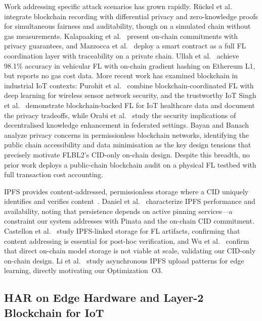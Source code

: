 \documentclass{llncs}
\begin{document}
Work addressing specific attack scenarios has grown rapidly. Rückel et
al.~\cite{ruckel2022fairness} integrate blockchain recording with
differential privacy and zero-knowledge proofs for simultaneous fairness and
auditability, though on a simulated chain without gas measurements.
Kalapaaking et al.~\cite{kalapaaking2024auditable} present on-chain
commitments with privacy guarantees, and Mazzocca et
al.~\cite{mazzocca2025fedcoordination} deploy a smart contract as a full
FL coordination layer with traceability on a private chain. Ullah et
al.~\cite{ullah2025spbfl} achieve 98.1\% accuracy in vehicular FL with
on-chain gradient hashing on Ethereum L1, but reports no gas cost data.
More recent work has examined blockchain in industrial IoT contexts:
Purohit et al.~\cite{purohit2024fedblocks} combine blockchain-coordinated FL with deep
learning for wireless sensor network security, and the trustworthy IoT
Singh et al.~\cite{singh2022framework} demonstrate
blockchain-backed FL for IoT healthcare data and document the privacy
tradeoffs, while Orabi et al.~\cite{orabi2025adapting} study the security
implications of decentralised knowledge enhancement in federated settings.
Bayan and Banach~\cite{bayan2023exploring} analyze privacy concerns
in permissionless blockchain networks, identifying the public chain
accessibility and data minimisation as the key design tensions that
precisely motivate FLBL2's CID-only on-chain design.
Despite this breadth, no prior work deploys a public-chain blockchain audit
on a physical FL testbed with full transaction cost accounting.

IPFS provides content-addressed, permissionless storage where a CID
uniquely identifies and verifies content~\cite{benet2014ipfs}. Daniel et
al.~\cite{daniel2022ipfs} characterize IPFS performance and availability,
noting that persistence depends on active pinning services---a constraint our system addresses with Pinata and the on-chain CID commitment.
Castellon et al.~\cite{castellon2022ipls} study IPFS-linked storage for
FL artifacts, confirming that content addressing is essential for
post-hoc verification, and Wu et al.~\cite{wu2026bfmil} confirm that
direct on-chain model storage is not viable at scale, validating our
CID-only on-chain design. Li et al.~\cite{li2025asyncipfs} study
asynchronous IPFS upload patterns for edge learning, directly motivating
our Optimization~O3.

\subsection{HAR on Edge Hardware and Layer-2 Blockchain for IoT}
\end{document}
